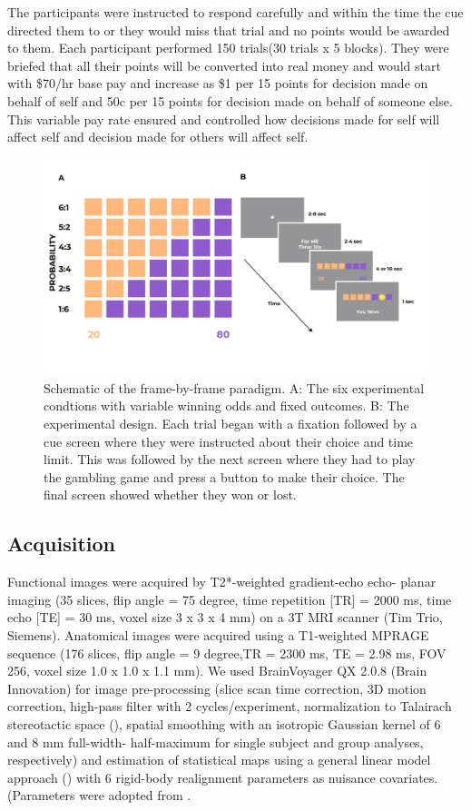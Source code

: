 \documentclass[11pt]{article}
\begin{document}
The participants were instructed to respond carefully and within the time the cue directed them to or they would miss that trial and no points would be awarded to them. Each participant performed 150 trials(30 trials x 5 blocks). They were briefed that all their points will be converted into real money and would start with \$70/hr base pay and increase as \$1 per 15 points for decision made on behalf of self and 50c per 15 points for decision made on behalf of someone else. This variable pay rate ensured and controlled how decisions made for self will affect self and decision made for others will affect self.
\begin{figure}[H]
    \centering
        \includegraphics[scale=0.2]{figures/paradigm.jpg}
    \caption{Schematic of the frame-by-frame paradigm. A: The six experimental condtions with variable winning odds and fixed outcomes. B: The experimental design. Each trial began with a fixation followed by a cue screen where they were instructed about their choice and time limit. This was followed by the next screen where they had to play the gambling game and press a button to make their choice. The final screen showed whether they won or lost.}
    \label{fig:1}
\end{figure}
\subsection{Acquisition}
Functional images were acquired by T2*-weighted gradient-echo echo- planar imaging (35 slices, flip angle = 75 degree, time repetition [TR] = 2000 ms, time echo [TE] = 30 ms, voxel size 3 x 3 x 4 mm) on a 3T MRI scanner (Tim Trio, Siemens). Anatomical images were acquired using a T1-weighted MPRAGE sequence (176 slices, flip angle = 9 degree,TR = 2300 ms, TE = 2.98 ms, FOV 256, voxel size 1.0 x 1.0 x 1.1 mm). We used BrainVoyager QX 2.0.8 (Brain Innovation) for image pre-processing (slice scan time correction, 3D motion correction, high-pass filter with 2 cycles/experiment, normalization to Talairach stereotactic space (\cite{talairach1988co}), spatial smoothing with an isotropic Gaussian kernel of 6 and 8 mm full-width- half-maximum for single subject and group analyses, respectively) and estimation of statistical maps using a general linear model approach (\citet{friston1994functional}) with 6 rigid-body realignment parameters as nuisance covariates.(Parameters were adopted from \citet{hesselmann2011link}. 
\end{document}
